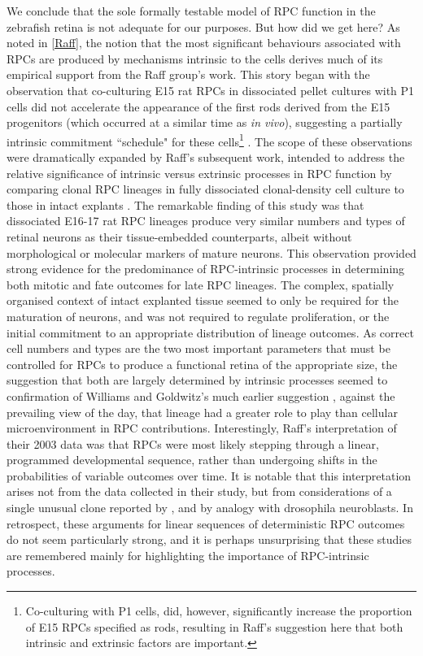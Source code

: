 We conclude that the sole formally testable model of RPC function in the zebrafish retina is not adequate for our purposes. But how did we get here? As noted in \autoref{Raff}, the notion that the most significant behaviours associated with RPCs are produced by mechanisms intrinsic to the cells derives much of its empirical support from the Raff group's work. This story began with the observation that co-culturing E15 rat RPCs in dissociated pellet cultures with P1 cells did not accelerate the appearance of the first rods derived from the E15 progenitors (which occurred at a similar time as \textit{in vivo}), suggesting a partially intrinsic commitment ``schedule" for these cells\footnote{Co-culturing with P1 cells, did, however, significantly increase the proportion of E15 RPCs specified as rods, resulting in Raff's suggestion here that both intrinsic and extrinsic factors are important.} \cite{Watanabe1990}. The scope of these observations were dramatically expanded by Raff's subsequent work, intended to address the relative significance of intrinsic versus extrinsic processes in RPC function by comparing clonal RPC lineages in fully dissociated clonal-density cell culture to those in intact explants \cite{Cayouette2003}. The remarkable finding of this study was that dissociated E16-17 rat RPC lineages produce very similar numbers and types of retinal neurons as their tissue-embedded counterparts, albeit without morphological or molecular markers of mature neurons. This observation provided strong evidence for the predominance of RPC-intrinsic processes in determining both mitotic and fate outcomes for late RPC lineages. The complex, spatially organised context of intact explanted tissue seemed to only be required for the maturation of neurons, and was not required to regulate proliferation, or the initial commitment to an appropriate distribution of lineage outcomes. As correct cell numbers and types are the two most important parameters that must be controlled for RPCs to produce a functional retina of the appropriate size, the suggestion that both are largely determined by intrinsic processes seemed to confirmation of Williams and Goldwitz's much earlier suggestion \cite{Williams1992}, against the prevailing view of the day, that lineage had a greater role to play than cellular microenvironment in RPC contributions. Interestingly, Raff's interpretation of their 2003 data was that RPCs were most likely stepping through a linear, programmed developmental sequence, rather than undergoing shifts in the probabilities of variable outcomes over time. It is notable that this interpretation arises not from the data collected in their study, but from considerations of a single unusual clone reported by \cite{Turner1990}, and by analogy with drosophila neuroblasts. In retrospect, these arguments for linear sequences of deterministic RPC outcomes do not seem particularly strong, and it is perhaps unsurprising that these studies are remembered mainly for highlighting the importance of RPC-intrinsic processes.

